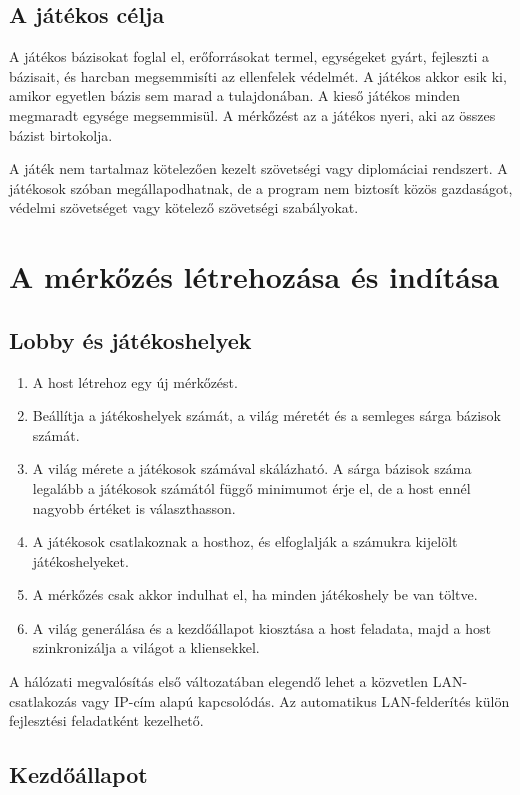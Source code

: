 \documentclass[12pt,a4paper]{article}
\begin{document}
\subsection{A játékos célja}

A játékos bázisokat foglal el, erőforrásokat termel, egységeket gyárt, fejleszti a bázisait, és harcban megsemmisíti az ellenfelek védelmét. A játékos akkor esik ki, amikor egyetlen bázis sem marad a tulajdonában. A kieső játékos minden megmaradt egysége megsemmisül. A mérkőzést az a játékos nyeri, aki az összes bázist birtokolja.

A játék nem tartalmaz kötelezően kezelt szövetségi vagy diplomáciai rendszert. A játékosok szóban megállapodhatnak, de a program nem biztosít közös gazdaságot, védelmi szövetséget vagy kötelező szövetségi szabályokat.

\section{A mérkőzés létrehozása és indítása}

\subsection{Lobby és játékoshelyek}

\begin{enumerate}
  \item A host létrehoz egy új mérkőzést.
  \item Beállítja a játékoshelyek számát, a világ méretét és a semleges sárga bázisok számát.
  \item A világ mérete a játékosok számával skálázható. A sárga bázisok száma legalább a játékosok számától függő minimumot érje el, de a host ennél nagyobb értéket is választhasson.
  \item A játékosok csatlakoznak a hosthoz, és elfoglalják a számukra kijelölt játékoshelyeket.
  \item A mérkőzés csak akkor indulhat el, ha minden játékoshely be van töltve.
  \item A világ generálása és a kezdőállapot kiosztása a host feladata, majd a host szinkronizálja a világot a kliensekkel.
\end{enumerate}

A hálózati megvalósítás első változatában elegendő lehet a közvetlen LAN-csatlakozás vagy IP-cím alapú kapcsolódás. Az automatikus LAN-felderítés külön fejlesztési feladatként kezelhető.

\subsection{Kezdőállapot}
\end{document}
